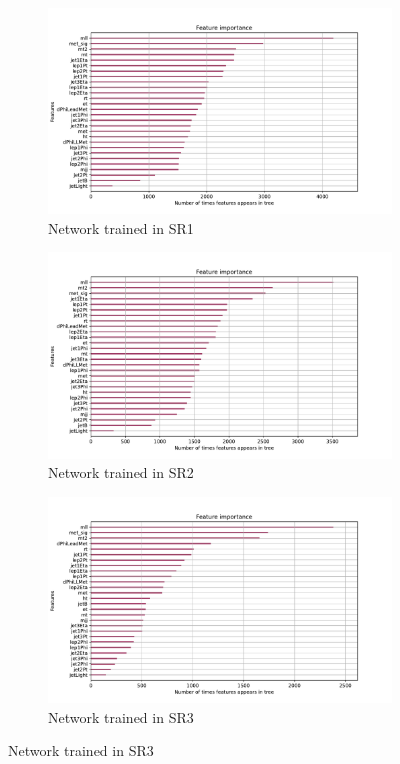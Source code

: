 \documentclass[12pt, a4paper]{book}
\begin{document}
\begin{figure}[!ht]
	\centering
	\begin{subfigure}[b]{0.7\textwidth}
      \centering
      \includegraphics[width=1\textwidth]{XGBoost/Model_independent/50-100/feature_importance/weight.pdf}\caption{Network trained in SR1}
      \end{subfigure}
      \hfill
      \begin{subfigure}[b]{0.7\textwidth}
         \centering
         \includegraphics[width=1\textwidth]{XGBoost/Model_independent/100-150/feature_importance/weight.pdf}\caption{Network trained in SR2}
      \end{subfigure}
      \hfill
      \begin{subfigure}[b]{0.7\textwidth}
         \centering
         \includegraphics[width=1\textwidth]{XGBoost/Model_independent/150/feature_importance/weight.pdf}\caption{Network trained in SR3}

\end{subfigure}
\end{figure}
\end{document}
